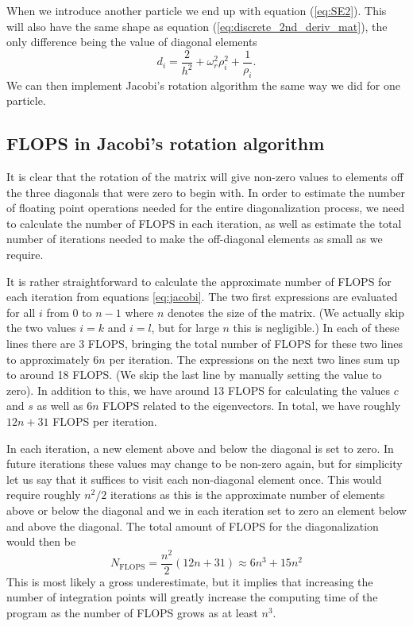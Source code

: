 \documentclass[reprint,english,notitlepage,nofootinbib]{revtex4-1}  %
\begin{document}
When we introduce another particle we end up with equation (\ref{eq:SE2}). This will also have the same shape as equation (\ref{eq:discrete_2nd_deriv_mat}), the only difference being the value of diagonal elements
\begin{equation*}
	d_i = \frac{2}{h^2} + \omega_r^2\rho_i^2 + \frac{1}{\rho_i}.
\end{equation*}
We can then implement Jacobi's rotation algorithm the same way we did for one particle.


\subsection{FLOPS in Jacobi's rotation algorithm}

It is clear that the rotation of the matrix will give non-zero values to elements off the three diagonals that were zero to begin with. In order to estimate the number of floating point operations needed for the entire diagonalization process, we need to calculate the number of FLOPS in each iteration, as well as estimate the total number of iterations needed to make the off-diagonal elements as small as we require.

It is rather straightforward to calculate the approximate number of FLOPS for each iteration from equations \ref{eq:jacobi}. The two first expressions are evaluated for all $i$ from 0 to $n-1$ where $n$ denotes the size of the matrix. (We actually skip the two values $i = k$ and $i = l$, but for large $n$ this is negligible.) In each of these lines there are 3 FLOPS, bringing the total number of FLOPS for these two lines to approximately $6 n$ per iteration. The expressions on the next two lines sum up to around 18 FLOPS. (We skip the last line by manually setting the value to zero). In addition to this, we have around 13 FLOPS for calculating the values $c$ and $s$ as well as $6 n$ FLOPS related to the eigenvectors. In total, we have roughly $12 n + 31$ FLOPS per iteration.

In each iteration, a new element above and below the diagonal is set to zero. In future iterations these values may change to be non-zero again, but for simplicity let us say that it suffices to visit each non-diagonal element once. This would require roughly $n^2/2$ iterations as this is the approximate number of elements above or below the diagonal and we in each iteration set to zero an element below and above the diagonal. The total amount of FLOPS for the diagonalization would then be
\begin{equation}
  \label{eq:FLOPS}
  N_{\text{FLOPS}} = \frac{n^2}{2} (12 n + 31) \approx 6 n^3 + 15 n^2
\end{equation}
This is most likely a gross underestimate, but it implies that increasing the number of integration points will greatly increase the computing time of the program as the number of FLOPS grows as at least $n^3$.
\end{document}
